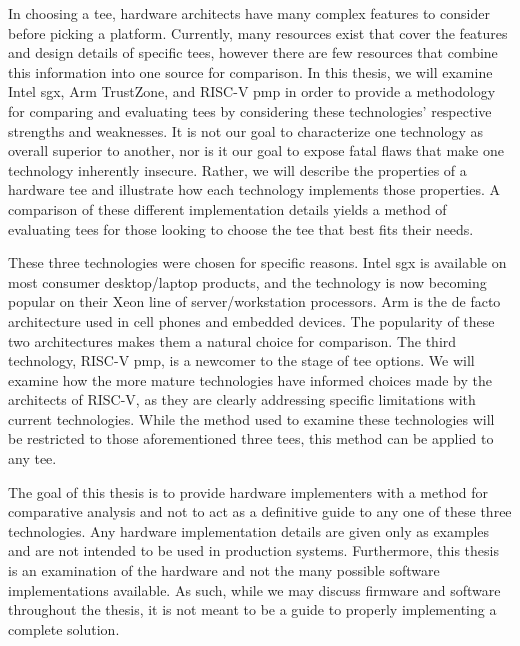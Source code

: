 In choosing a \gls{tee}, hardware architects have many complex features to consider before picking a platform. Currently, many resources exist that cover the features and design details of specific \glspl{tee}, however there are few resources that combine this information into one source for comparison. In this thesis, we will examine Intel \gls{sgx}, Arm TrustZone, and RISC-V \gls{pmp} in order to provide a methodology for comparing and evaluating \glspl{tee} by considering these technologies' respective strengths and weaknesses. It is not our goal to characterize one technology as overall superior to another, nor is it our goal to expose fatal flaws that make one technology inherently insecure. Rather, we will describe the properties of a hardware \gls{tee} and illustrate how each technology implements those properties. A comparison of these different implementation details yields a method of evaluating \glspl{tee} for those looking to choose the \gls{tee} that best fits their needs.

These three technologies were chosen for specific reasons. Intel \gls{sgx} is available on most consumer desktop/laptop products, and the technology is now becoming popular on their Xeon line of server/workstation processors. Arm is the de facto architecture used in cell phones and embedded devices. The popularity of these two architectures makes them a natural choice for comparison. The third technology, RISC-V \gls{pmp}, is a newcomer to the stage of \gls{tee} options. We will examine how the more mature technologies have informed choices made by the architects of RISC-V, as they are clearly addressing specific limitations with current technologies. While the method used to examine these technologies will be restricted to those aforementioned three \glspl{tee}, this method can be applied to any \gls{tee}.

The goal of this thesis is to provide hardware implementers with a method for comparative analysis and not to act as a definitive guide to any one of these three technologies. Any hardware implementation details are given only as examples and are not intended to be used in production systems. Furthermore, this thesis is an examination of the hardware and not the many possible software implementations available. As such, while we may discuss firmware and software throughout the thesis, it is not meant to be a guide to properly implementing a complete solution.

